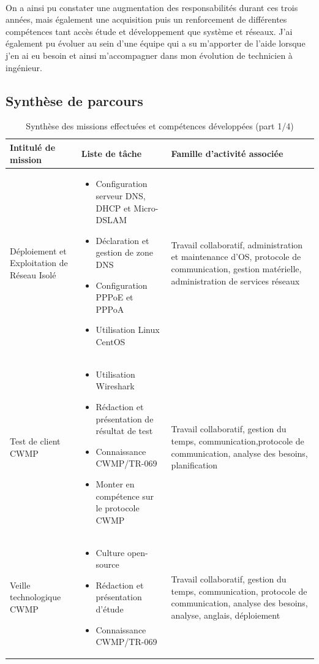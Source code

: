 \documentclass[12pt,a4paper]{report}
\begin{document}
\paragraph*{}On a ainsi pu constater une augmentation des responsabilités durant ces trois années, mais également une acquisition puis un renforcement de différentes compétences tant accès étude et développement que système et réseaux. J'ai également pu évoluer au sein d'une équipe qui a su m'apporter de l'aide lorsque j'en ai eu besoin et ainsi m'accompagner dans mon évolution de technicien à ingénieur.
\subsection{Synthèse de parcours}
\newpage
\begin{table}
	\begin{tabularx}{16cm}{|X|X|X|}
		\hline
		Intitulé de mission & Liste de tâche & Famille d'activité associée\tabularnewline
		\hline
		Déploiement et Exploitation de Réseau Isolé 
			& 
				\begin{itemize}
				\item Configuration serveur DNS, DHCP et Micro-DSLAM
				\item Déclaration et gestion de zone DNS
				\item Configuration PPPoE et PPPoA
				\item Utilisation Linux CentOS
				\end{itemize} 
			& Travail collaboratif, administration et maintenance d'OS, protocole de communication, gestion matérielle, administration de services réseaux \tabularnewline
		\hline
		Test de client CWMP 
			& 
				\begin{itemize}
				\item Utilisation Wireshark
				\item Rédaction et présentation de résultat de test
				\item Connaissance CWMP/TR-069
				\item Monter en compétence sur le protocole CWMP
				\end{itemize}
			& Travail collaboratif, gestion du temps, communication,protocole de communication, analyse des besoins, planification \tabularnewline
		\hline
		Veille technologique CWMP 
			& 
				\begin{itemize}
				\item Culture open-source
				\item Rédaction et présentation d'étude
				\item Connaissance CWMP/TR-069
				\end{itemize}
			& Travail collaboratif, gestion du temps, communication, protocole de communication, analyse des besoins, analyse, anglais, déploiement \tabularnewline
		\hline
		\end{tabularx}
	\centering
	\caption{Synthèse des missions effectuées et compétences développées (part 1/4)}
\end{table}
\end{document}
